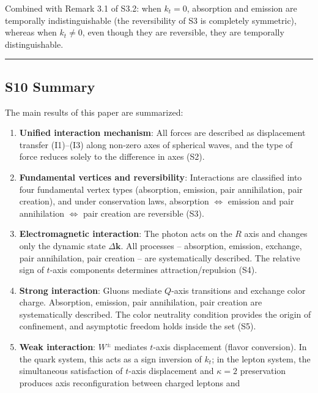 \documentclass[
  a4paper,11pt]{article}
\theoremstyle{definition}
\theoremstyle{remark}
\begin{document}
Combined with Remark 3.1 of S3.2: when \(k_t = 0\), absorption and
emission are temporally indistinguishable (the reversibility of S3 is
completely symmetric), whereas when \(k_t \neq 0\), even though they are
reversible, they are temporally distinguishable.

\begin{center}\rule{0.5\linewidth}{0.5pt}\end{center}

\subsection{S10 Summary}\label{s10-summary}

The main results of this paper are summarized:

\begin{enumerate}
\def\labelenumi{\arabic{enumi}.}
\item
  \textbf{Unified interaction mechanism}: All forces are described as
  displacement transfer (I1)--(I3) along non-zero axes of spherical
  waves, and the type of force reduces solely to the difference in axes
  (S2).
\item
  \textbf{Fundamental vertices and reversibility}: Interactions are
  classified into four fundamental vertex types (absorption, emission,
  pair annihilation, pair creation), and under conservation laws,
  absorption \(\Leftrightarrow\) emission and pair annihilation
  \(\Leftrightarrow\) pair creation are reversible (S3).
\item
  \textbf{Electromagnetic interaction}: The photon acts on the \(R\)
  axis and changes only the dynamic state \(\Delta\mathbf{k}\). All
  processes -- absorption, emission, exchange, pair annihilation, pair
  creation -- are systematically described. The relative sign of
  \(t\)-axis components determines attraction/repulsion (S4).
\item
  \textbf{Strong interaction}: Gluons mediate \(Q\)-axis transitions and
  exchange color charge. Absorption, emission, pair annihilation, pair
  creation are systematically described. The color neutrality condition
  provides the origin of confinement, and asymptotic freedom holds
  inside the set (S5).
\item
  \textbf{Weak interaction}: \(W^{\pm}\) mediates \(t\)-axis
  displacement (flavor conversion). In the quark system, this acts as a
  sign inversion of \(k_t\); in the lepton system, the simultaneous
  satisfaction of \(t\)-axis displacement and \(\kappa = 2\)
  preservation produces axis reconfiguration between charged leptons and

\end{enumerate}
\end{document}
